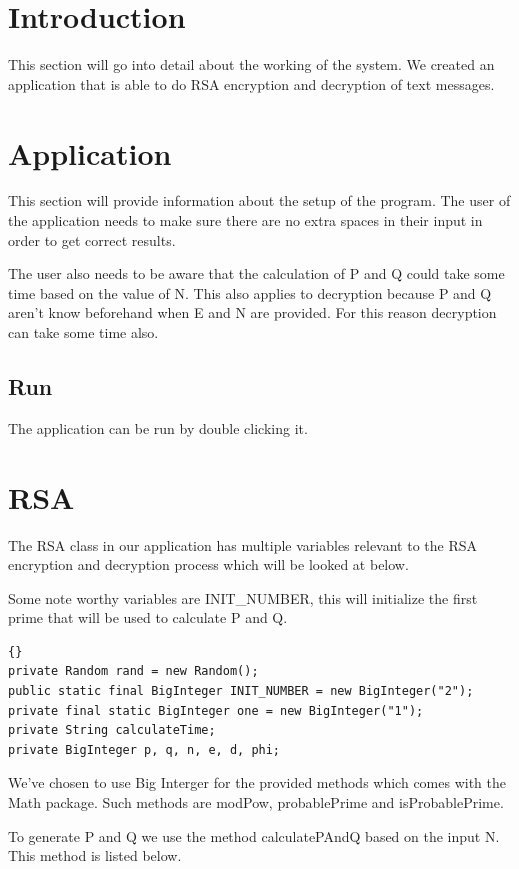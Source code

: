 \section{Introduction} \label{man-introduction}
This section will go into detail about the working of the system.
We created an application that is able to do RSA encryption and decryption
of text messages.

\section{Application} \label{man-application}
This section will provide information about the setup of the program.
The user of the application needs to make sure there are no extra spaces
in their input in order to get correct results.

The user also needs to be aware that the calculation of P and Q could
take some time based on the value of N.
This also applies to decryption because P and Q aren't know beforehand
when E and N are provided. For this reason decryption can take some time also.

\subsection{Run}
The application can be run by double clicking it.

\section{RSA}
The RSA class in our application has multiple variables relevant to the
RSA encryption and decryption process which will be looked at below.

Some note worthy variables are INIT\_NUMBER, this will initialize
the first prime that will be used to calculate P and Q.

\begin{lstlisting}{}
private Random rand = new Random();
public static final BigInteger INIT_NUMBER = new BigInteger("2");
private final static BigInteger one = new BigInteger("1");
private String calculateTime;
private BigInteger p, q, n, e, d, phi;
\end{lstlisting}

We've chosen to use Big Interger for the provided methods which comes with the Math package.
Such methods are modPow, probablePrime and isProbablePrime.

To generate P and Q we use the method calculatePAndQ based on the input N.
This method is listed below.

